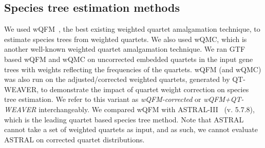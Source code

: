 \documentclass[10pt,a4paper]{article}
\newcommand{\addb}[1]{{\color{red} #1}}
\begin{document}


\subsection{Species tree estimation methods}
We used wQFM~\cite{wqfm}, the best existing weighted quartet amalgamation technique, to estimate species trees from weighted quartets. We also used wQMC, which is another well-known weighted quartet amalgamation technique. %
We ran GTF based wQFM and wQMC on uncorrected embedded quartets in the input gene trees with weights reflecting the frequencies of the quartets. %
wQFM (and wQMC) was also run on the adjusted/corrected weighted quartets, generated by QT-WEAVER, to demonstrate the impact of quartet weight correction on species tree estimation. We refer to this variant as \textit{wQFM-corrected} or \textit{wQFM+QT-WEAVER} interchangeably. We compared wQFM with ASTRAL-III~\cite{astral,zhang2018astral} (v. 5.7.8), which is the leading quartet based species tree method. Note that ASTRAL cannot take a set of weighted quartets as input, and as such, we cannot evaluate ASTRAL on corrected quartet distributions.



 
\end{document}
